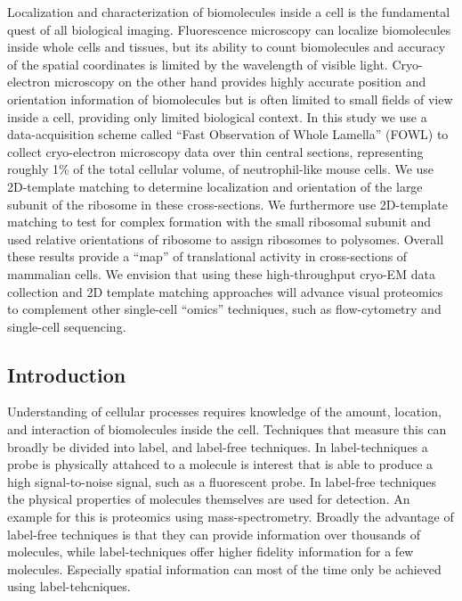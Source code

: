 \documentclass[
]{article}
\begin{document}
Localization and characterization of biomolecules inside a cell is the fundamental quest of all biological imaging. Fluorescence microscopy can localize biomolecules inside whole cells and tissues, but its ability to count biomolecules and accuracy of the spatial coordinates is limited by the wavelength of visible light. Cryo-electron microscopy on the other hand provides highly accurate position and orientation information of biomolecules but is often limited to small fields of view inside a cell, providing only limited biological context. In this study we use a data-acquisition scheme called ``Fast Observation of Whole Lamella'' (FOWL) to collect cryo-electron microscopy data over thin central sections, representing roughly 1\% of the total cellular volume, of neutrophil-like mouse cells. We use 2D-template matching to determine localization and orientation of the large subunit of the ribosome in these cross-sections. We furthermore use 2D-template matching to test for complex formation with the small ribosomal subunit and used relative orientations of ribosome to assign ribosomes to polysomes. Overall these results provide a ``map'' of translational activity in cross-sections of mammalian cells. We envision that using these high-throughput cryo-EM data collection and 2D template matching approaches will advance visual proteomics to complement other single-cell ``omics'' techniques, such as flow-cytometry and single-cell sequencing.

\hypertarget{introduction}{%
\subsection{Introduction}\label{introduction}}

Understanding of cellular processes requires knowledge of the amount, location, and interaction of biomolecules inside the cell. Techniques that measure this can broadly be divided into label, and label-free techniques. In label-techniques a probe is physically attahced to a molecule is interest that is able to produce a high signal-to-noise signal, such as a fluorescent probe. In label-free techniques the physical properties of molecules themselves are used for detection. An example for this is proteomics using mass-spectrometry. Broadly the advantage of label-free techniques is that they can provide information over thousands of molecules, while label-techniques offer higher fidelity information for a few molecules. Especially spatial information can most of the time only be achieved using label-tehcniques.
\end{document}
